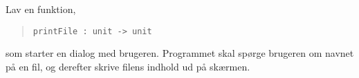 Lav en funktion,
  \begin{quote}
    \mbox{\lstinline!printFile : unit -> unit!}
  \end{quote}
  som starter en dialog med brugeren. Programmet skal spørge brugeren om navnet på en fil, og derefter skrive filens indhold ud på skærmen.
